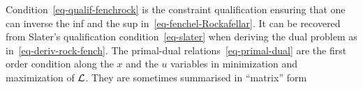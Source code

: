Condition~\eqref{eq-qualif-fenchrock} is the constraint qualification ensuring that one can inverse the inf and the sup in~\eqref{eq-fenchel-Rockafellar}. It can be recovered from Slater's qualification condition~\eqref{eq-slater} when deriving the dual problem as in~\eqref{eq-deriv-rock-fench}.
%
The primal-dual relations~\eqref{eq-primal-dual} are the first order condition along the $x$ and the $u$ variables in minimization and maximization of $\mathcal{L}$. They are sometimes summarised in ``matrix'' form 
